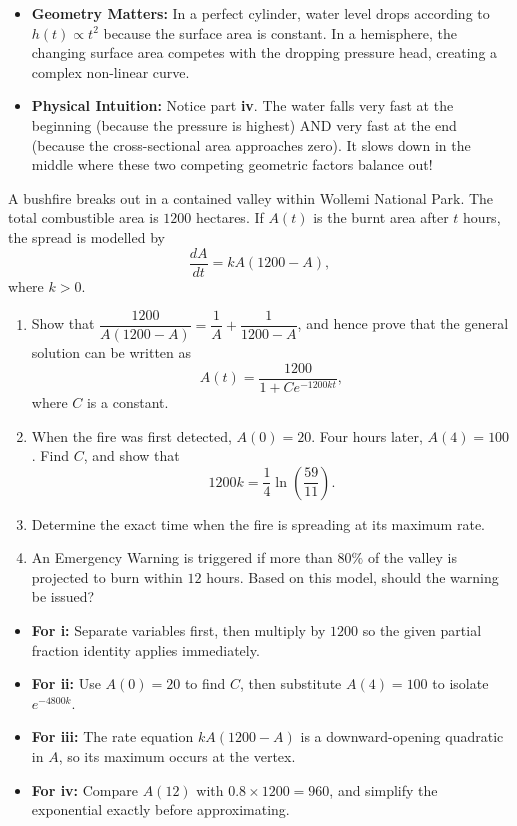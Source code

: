 \begin{takeaways}
\begin{itemize}[leftmargin=*]
    \item \textbf{Geometry Matters:} In a perfect cylinder, water level drops according to $h(t) \propto t^2$ because the surface area is constant. In a hemisphere, the changing surface area competes with the dropping pressure head, creating a complex non-linear curve.
    \item \textbf{Physical Intuition:} Notice part \textbf{iv}. The water falls very fast at the beginning (because the pressure is highest) AND very fast at the end (because the cross-sectional area approaches zero). It slows down in the middle where these two competing geometric factors balance out!
\end{itemize}
\end{takeaways}

\begin{problem}
A bushfire breaks out in a contained valley within Wollemi National Park. The total combustible area is $1200$ hectares. If $A(t)$ is the burnt area after $t$ hours, the spread is modelled by
\[
\frac{dA}{dt}=kA(1200-A),
\]
where $k>0$.

\begin{enumerate}
    \item[\textbf{i}] Show that $\dfrac{1200}{A(1200-A)}=\dfrac1A+\dfrac{1}{1200-A}$, and hence prove that the general solution can be written as
    \[
    A(t)=\frac{1200}{1+Ce^{-1200kt}},
    \]
    where $C$ is a constant.
    \item[\textbf{ii}] When the fire was first detected, $A(0)=20$. Four hours later, $A(4)=100$. Find $C$, and show that
    \[
    1200k=\frac14\ln\left(\frac{59}{11}\right).
    \]
    \item[\textbf{iii}] Determine the exact time when the fire is spreading at its maximum rate.
    \item[\textbf{iv}] An Emergency Warning is triggered if more than $80\%$ of the valley is projected to burn within $12$ hours. Based on this model, should the warning be issued?
\end{enumerate}
\end{problem}

\begin{hint}
\begin{itemize}[leftmargin=*]
    \item \textbf{For i:} Separate variables first, then multiply by $1200$ so the given partial fraction identity applies immediately.
    \item \textbf{For ii:} Use $A(0)=20$ to find $C$, then substitute $A(4)=100$ to isolate $e^{-4800k}$.
    \item \textbf{For iii:} The rate equation $kA(1200-A)$ is a downward-opening quadratic in $A$, so its maximum occurs at the vertex.
    \item \textbf{For iv:} Compare $A(12)$ with $0.8\times 1200=960$, and simplify the exponential exactly before approximating.
\end{itemize}
\end{hint}

